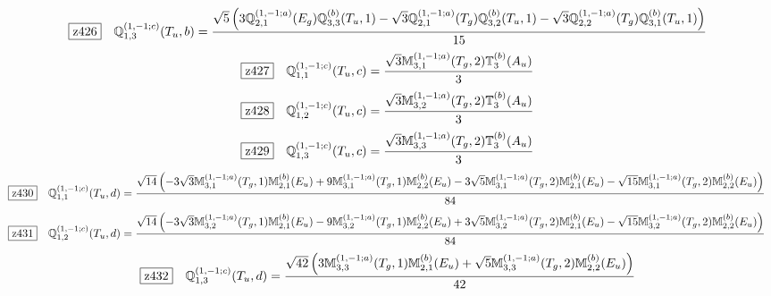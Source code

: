 \documentclass[fleqn,10pt,landscape]{jsarticle}
\begin{document}
\begin{dmath*}
\hspace*{3mm}\fbox{z426}\quad \mathbb{Q}_{1,3}^{(1,-1;c)}(T_{u},b)=\frac{\sqrt{5} \left(3 \mathbb{Q}_{2,1}^{(1,-1;a)}(E_{g}) \mathbb{Q}_{3,3}^{(b)}(T_{u},1) - \sqrt{3} \mathbb{Q}_{2,1}^{(1,-1;a)}(T_{g}) \mathbb{Q}_{3,2}^{(b)}(T_{u},1) - \sqrt{3} \mathbb{Q}_{2,2}^{(1,-1;a)}(T_{g}) \mathbb{Q}_{3,1}^{(b)}(T_{u},1)\right)}{15}
\end{dmath*}
\begin{dmath*}
\hspace*{3mm}\fbox{z427}\quad \mathbb{Q}_{1,1}^{(1,-1;c)}(T_{u},c)=\frac{\sqrt{3} \mathbb{M}_{3,1}^{(1,-1;a)}(T_{g},2) \mathbb{T}_{3}^{(b)}(A_{u})}{3}
\end{dmath*}
\begin{dmath*}
\hspace*{3mm}\fbox{z428}\quad \mathbb{Q}_{1,2}^{(1,-1;c)}(T_{u},c)=\frac{\sqrt{3} \mathbb{M}_{3,2}^{(1,-1;a)}(T_{g},2) \mathbb{T}_{3}^{(b)}(A_{u})}{3}
\end{dmath*}
\begin{dmath*}
\hspace*{3mm}\fbox{z429}\quad \mathbb{Q}_{1,3}^{(1,-1;c)}(T_{u},c)=\frac{\sqrt{3} \mathbb{M}_{3,3}^{(1,-1;a)}(T_{g},2) \mathbb{T}_{3}^{(b)}(A_{u})}{3}
\end{dmath*}
\begin{dmath*}
\hspace*{3mm}\fbox{z430}\quad \mathbb{Q}_{1,1}^{(1,-1;c)}(T_{u},d)=\frac{\sqrt{14} \left(- 3 \sqrt{3} \mathbb{M}_{3,1}^{(1,-1;a)}(T_{g},1) \mathbb{M}_{2,1}^{(b)}(E_{u}) + 9 \mathbb{M}_{3,1}^{(1,-1;a)}(T_{g},1) \mathbb{M}_{2,2}^{(b)}(E_{u}) - 3 \sqrt{5} \mathbb{M}_{3,1}^{(1,-1;a)}(T_{g},2) \mathbb{M}_{2,1}^{(b)}(E_{u}) - \sqrt{15} \mathbb{M}_{3,1}^{(1,-1;a)}(T_{g},2) \mathbb{M}_{2,2}^{(b)}(E_{u})\right)}{84}
\end{dmath*}
\begin{dmath*}
\hspace*{3mm}\fbox{z431}\quad \mathbb{Q}_{1,2}^{(1,-1;c)}(T_{u},d)=\frac{\sqrt{14} \left(- 3 \sqrt{3} \mathbb{M}_{3,2}^{(1,-1;a)}(T_{g},1) \mathbb{M}_{2,1}^{(b)}(E_{u}) - 9 \mathbb{M}_{3,2}^{(1,-1;a)}(T_{g},1) \mathbb{M}_{2,2}^{(b)}(E_{u}) + 3 \sqrt{5} \mathbb{M}_{3,2}^{(1,-1;a)}(T_{g},2) \mathbb{M}_{2,1}^{(b)}(E_{u}) - \sqrt{15} \mathbb{M}_{3,2}^{(1,-1;a)}(T_{g},2) \mathbb{M}_{2,2}^{(b)}(E_{u})\right)}{84}
\end{dmath*}
\begin{dmath*}
\hspace*{3mm}\fbox{z432}\quad \mathbb{Q}_{1,3}^{(1,-1;c)}(T_{u},d)=\frac{\sqrt{42} \left(3 \mathbb{M}_{3,3}^{(1,-1;a)}(T_{g},1) \mathbb{M}_{2,1}^{(b)}(E_{u}) + \sqrt{5} \mathbb{M}_{3,3}^{(1,-1;a)}(T_{g},2) \mathbb{M}_{2,2}^{(b)}(E_{u})\right)}{42}
\end{dmath*}
\end{document}
